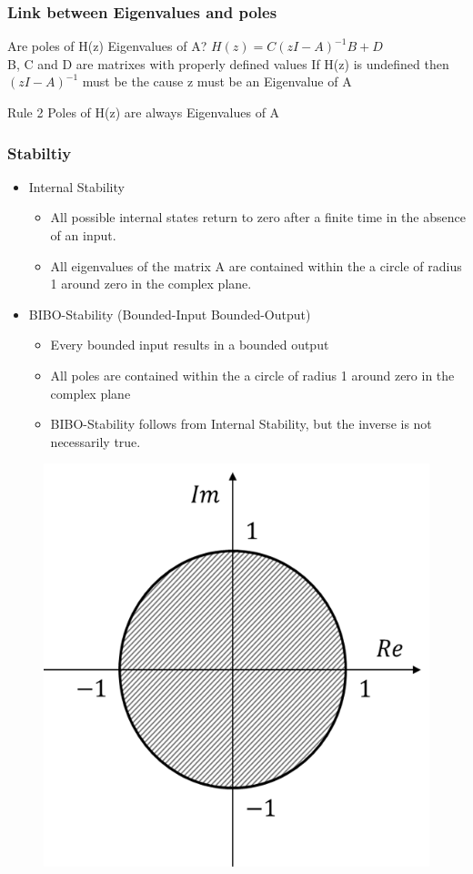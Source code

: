 \begin{frame}
	\frametitle{Link between Eigenvalues and poles}
	Are poles of H(z) Eigenvalues of A?
	$H(z) = C(zI-A)^{-1}B + D$ \\
	B, C and D are matrixes with properly defined values
	If H(z) is undefined then $(zI-A)^{-1}$ must be the cause
	z must be an Eigenvalue of A
	\begin{block}{Rule 2}
		Poles of H(z) are always Eigenvalues of A 
	\end{block}
\end{frame}
\begin{frame}
	\frametitle{Stabiltiy}
	\begin{itemize}
		\item Internal Stability
		\begin{itemize}
			\item All possible internal states return to zero after a finite time in the absence of an input.
			\item 	All eigenvalues of the matrix A are contained within the a circle of radius 1 around zero in the complex plane.
		\end{itemize}
		\item BIBO-Stability (Bounded-Input Bounded-Output)
		\begin{itemize}
			\item Every bounded input results in a bounded output
			\item All poles are contained within the a circle of radius 1 around zero in the complex plane
			\item BIBO-Stability follows from Internal Stability, but the inverse is not necessarily true.
		\end{itemize}
	\end{itemize}
\end{frame}
\begin{frame}
	\begin{figure}
\centering
\includegraphics[width=0.7\linewidth]{Images/discrete_time_systems_27}
\caption{}
\label{fig:discrete_time_systems_27}
\end{figure}
\end{frame}
